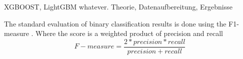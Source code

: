 XGBOOST, LightGBM whatever. 
Theorie, Datenaufbereitung, Ergebnisse

The standard evaluation of binary classification results is done using the F1-measure \citep{HADDI201326}. Where the score is a weighted product of precision and recall
\begin{equation} 
    F-measure = \frac{2*precision * recall}{precision + recall}
\end{equation}



